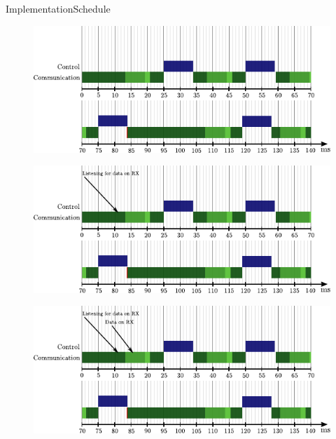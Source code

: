 \begin{frame}{Implementation}{Schedule}
    {
      \begin{figure}[H]
        \hspace*{-.8cm}
        \includegraphics[width=1.1\linewidth]{figures/newTimingDiagram1}
      \end{figure}
    }
    {
      \begin{figure}[H]
        \hspace*{-.8cm}
        \includegraphics[width=1.1\linewidth]{figures/newTimingDiagram2}
      \end{figure}
    }
    {
      \begin{figure}[H]
        \hspace*{-.8cm}
        \includegraphics[width=1.1\linewidth]{figures/newTimingDiagram3}
      \end{figure}
}
\end{frame}
